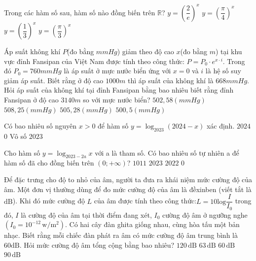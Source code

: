 \begin{ex}
Trong các hàm số sau, hàm số nào đồng biến trên $\mathbb{R}$?
\choice
{$y=\left(\dfrac{2}{e}\right)^x$}
{$y={{\left(\dfrac{\pi }{4}\right)}^x}$}
{$y={{\left(\dfrac{1}{3}\right)}^x}$}
{$y={{\left(\dfrac{\pi }{3}\right)}^x}$}
\end{ex}
\begin{ex}
{}
\end{ex}
\begin{ex}
Áp suất không khí $P$(đo bằng $mmHg$) giảm theo độ cao $x$(đo bằng $m$) tại khu vực đỉnh Fansipan của Việt Nam được tính theo công thức: $P=P_0 \cdot {e^{x \cdot i}}$. Trong đó $P_0=760mmHg$ là áp suất ở mực nước biển ứng với $x=0$ và $i$ là hệ số suy giảm áp suất. Biết rằng ở độ cao $1000m$ thì áp suất của không khí là $668mmHg$. Hỏi áp suất của không khí tại đỉnh Fansipan bằng bao nhiêu biết rằng đỉnh Fansipan ở độ cao $3140m$ so với mực nước biển?
\choice
{$502{,}58(mmHg)$}
{$508{,}25(mmHg)$}
{$505{,}28(mmHg)$}
{$500{,}5(mmHg)$}
\end{ex}
\begin{ex}
Có bao nhiêu số nguyên $x>0$ để hàm số $y=\log_{2023}(2024-x)$ xác định.
\choice
{$2024$}
{$0$}
{Vô số}
{$2023$}
\end{ex}
\begin{ex}
Cho hàm số $y={{\log }_{2023-2a}}x$ với a là tham số. Có bao nhiêu số tự nhiên a để hàm số đã cho đồng biến trên $\left(0;+\infty\right)$?
\choice
{$1011$}
{$2023$}
{$2022$}
{$0$}
\end{ex}
\begin{ex}
Để đặc trưng cho độ to nhỏ của âm, người ta đưa ra khái niệm mức cường độ của âm. Một đơn vị thường dùng để đo mức cường độ của âm là đềxinben (viết tắt là $\text{dB}$). Khi đó mức cường độ $L$ của âm được tính theo công thức:$L=10\text{log}\dfrac{I}{I_0}$ trong đó, $I$ là cường độ của âm tại thời điểm đang xét, $I_0$ cường độ âm ở ngưỡng nghe$\left(I_0=10^{-12}\,\text{w}/{{\text{m}}^2}\right)$. Có hai cây đàn ghita giống nhau, cùng hòa tấu một bản nhạc. Biết rằng mỗi chiếc đàn phát ra âm có mức cường độ âm trung bình là $60\text{dB}$. Hỏi mức cường độ âm tổng cộng bằng bao nhiêu?
\choice
{$120\,\text{dB}$}
{$63\,\text{dB}$}
{$60\,\text{dB}$}
{$90\,\text{dB}$}
\end{ex}

